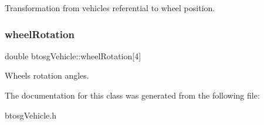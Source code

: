 Transformation from vehicle\textquotesingle{}s referential to wheel position. 

\mbox{\label{classbtosgVehicle_a0a9cd6f2c9b0defc44cd5e2e8d597418}} 
\subsubsection{\texorpdfstring{wheelRotation}{wheelRotation}}
{\footnotesize\ttfamily double btosg\+Vehicle\+::wheel\+Rotation\mbox{[}4\mbox{]}}



Wheels\textquotesingle{} rotation angles. 



The documentation for this class was generated from the following file\+:\begin{DoxyCompactItemize}
\item 
btosg\+Vehicle.\+h\end{DoxyCompactItemize}
